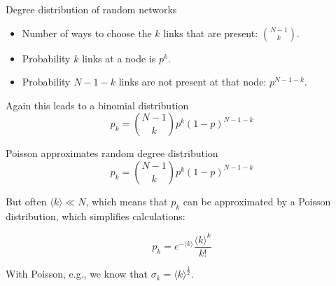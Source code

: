 \documentclass{beamer}
\begin{document}
\begin{frame}{Degree distribution of random networks}
  \begin{itemize}
    \item Number of ways to choose the $k$ links that are present:
      ${N-1 \choose k}$.
    \item Probability $k$ links at a node is $p^k$.
    \item Probability $N-1-k$ links are not present at that node: $p^{N-1-k}$.
  \end{itemize}
  Again this leads to a binomial distribution
  \[
    p_k = {N-1 \choose k} p^k (1-p)^{N-1-k}
  \]
\end{frame}

\begin{frame}{Poisson approximates random degree distribution}
  \[
    p_k = {N-1 \choose k} p^k (1-p)^{N-1-k}
  \]

  But often $\langle k \rangle \ll N$, which means that $p_k$ can be 
  approximated by a Poisson distribution, which simplifies calculations:

  \[
    p_k = e^{-\langle k \rangle} \frac{\langle k \rangle^k}{k!}
  \]

  With Poisson, e.g., we know that $\sigma_k = \langle k \rangle^{\frac{1}{2}}$.
\end{frame}
\end{document}
